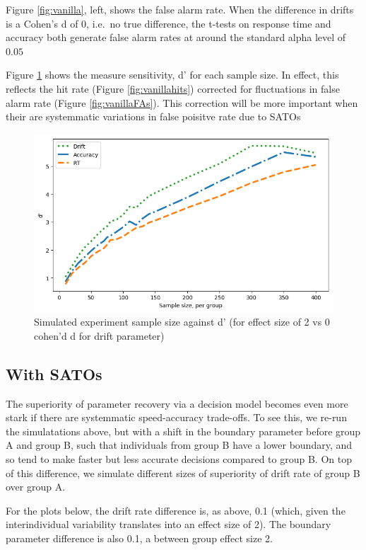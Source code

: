 \documentclass[floatsintext,doc]{apa6}
\theoremstyle{definition}
\theoremstyle{definition}
\theoremstyle{definition}
\theoremstyle{remark}
\begin{document}
Figure \ref{fig:vanilla}, left, shows the false alarm rate. When the
difference in drifts is a Cohen's d of 0, i.e.~no true difference, the
t-tests on response time and accuracy both generate false alarm rates at
around the standard alpha level of \(0.05\)

Figure \ref{fig:vanilladprime} shows the measure sensitivity, d' for
each sample size. In effect, this reflects the hit rate (Figure
\ref{fig:vanillahits}) corrected for fluctuations in false alarm rate
(Figure \ref{fig:vanillaFAs}). This correction will be more important
when their are systemmatic variations in false poisitve rate due to
SATOs

\begin{figure}

{\centering \includegraphics[width=0.68\linewidth]{figs/NOSATO_dprime} 

}

\caption{Simulated experiment sample size against d' (for effect size of 2 vs 0  cohen'd d for drift parameter)}\label{fig:vanilladprime}
\end{figure}

\subsection{With SATOs}\label{with-satos}

The superiority of parameter recovery via a decision model becomes even
more stark if there are systemmatic speed-accuracy trade-offs. To see
this, we re-run the simulatations above, but with a shift in the
boundary parameter before group A and group B, such that individuals
from group B have a lower boundary, and so tend to make faster but less
accurate decisions compared to group B. On top of this difference, we
simulate different sizes of superiority of drift rate of group B over
group A.

For the plots below, the drift rate difference is, as above, 0.1 (which,
given the interindividual variability translates into an effect size of
2). The boundary parameter difference is also 0.1, a between group
effect size 2.
\end{document}
